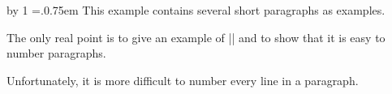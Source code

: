 \everypar
{%
     \advance\linenumber by 1%
     =\hbox{\the\linenumber.\kern0.75em}%
}%
This example contains several short paragraphs as examples.\par
The only real point is to give an example of |\everypar| and to show
that it is easy to number paragraphs.\par
Unfortunately, it is more difficult to number every line in a paragraph.\par
\bye
